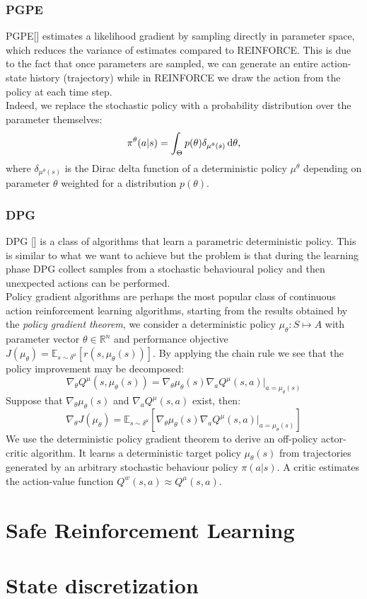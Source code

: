 \subsubsection{PGPE}
\acf{PGPE}[\citet{sehnke2008PolicyGradient}] estimates a likelihood gradient by sampling directly in parameter space, which reduces the variance of estimates compared to REINFORCE. This is due to the fact that once parameters are sampled, we can generate an entire action-state history (trajectory) while in REINFORCE we draw the action from the policy at each time step.\\
\newline
Indeed, we replace the stochastic policy with a probability distribution over the parameter themselves:
$$ \pi^{\theta}(a|s) = \int_{\Theta} p(\theta) \delta_{\mu^{\theta}(s)}\,\mathrm{d} \theta,
$$
where $\delta_{\mu^{\theta}(s)}$ is the Dirac delta function of a deterministic policy $\mu^{\theta}$ depending on parameter $\theta$ weighted for a distribution $p(\theta)$.


\subsubsection{DPG}
\acf{DPG} [\citet{article}] is a class of algorithms that learn a parametric deterministic policy. This is similar to what we want to achieve but the problem is that during the learning phase \ac{DPG} collect samples from a stochastic behavioural policy and then unexpected actions can be performed.\\
\newline
Policy gradient algorithms are perhaps the most popular class of continuous action reinforcement learning algorithms, starting from the results obtained by the \emph{policy gradient theorem}, we consider a deterministic policy $\mu_{\theta}: S \mapsto A$ with parameter vector $\theta \in \mathbb{R}^n$ and performance objective $J(\mu_{\theta}) = \mathbb{E}_{s \sim \delta^{\mu}}[r(s, \mu_{\theta}(s))]$. 
By applying the chain rule we see that the policy improvement may be decomposed:
$$
\nabla_{\theta} Q^{\mu}(s, \mu_{\theta}(s)) = \nabla_{\theta}\mu_{\theta}(s)\nabla_a Q^{\mu}(s, a)|_{a=\mu_{\theta}(s)}
$$
Suppose that $\nabla_{\theta}\mu_{\theta}(s)$ and $\nabla_aQ^{\mu}(s,a)$ exist, then:
$$
\nabla_{\theta}J(\mu_{\theta}) = \mathbb{E}_{s \sim \delta^{\mu}} [\nabla_{\theta} \mu_{\theta} (s) \nabla_a Q^{\mu}(s,a)|_{a = \mu_{\theta} (s)}]
$$
We use the deterministic policy gradient theorem to derive an off-policy actor-critic algorithm. It learns a deterministic target policy $\mu_{\theta}(s)$ from trajectories generated by an arbitrary stochastic behaviour policy $\pi(a|s)$. A critic estimates the action-value function $Q^w(s,a) \approx Q^{\mu}(s,a)$. 

\section{Safe Reinforcement Learning}\label{sec:saferl}

\section{State discretization}